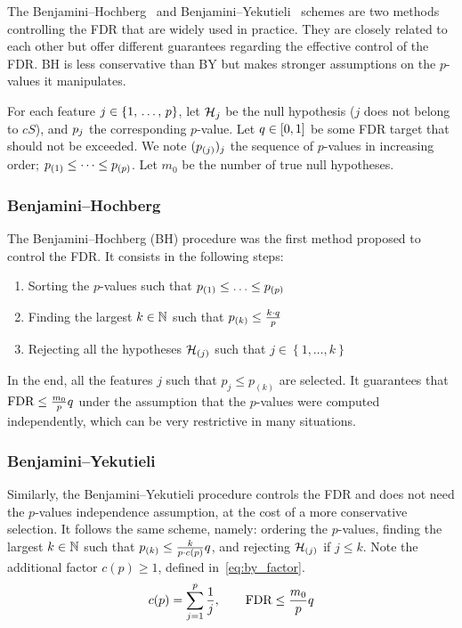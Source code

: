 The Benjamini–Hochberg~\cite{bh} and Benjamini–Yekutieli~\cite{by} schemes are two methods controlling the FDR
that are widely used in practice.
They are closely related to each other but offer different guarantees regarding the effective control of the FDR\@.
BH is less conservative than BY but makes stronger assumptions on the $p$-values it manipulates.

For each feature $j \in \left\{ 1,\, \dots,\, p \right\}$, let $\mathcal{H}_j$ be the null hypothesis ($j$ does not belong to $cS$),
and $p_j$ the corresponding $p$-value.
Let $q \in [0, 1]$ be some FDR target that should not be exceeded.
We note $(p_{(j)})_j$ the sequence of $p$-values in increasing order;
$p_{(1)} \leq \dots \leq p_{(p)}$.
Let $m_0$ be the number of true null hypotheses.

\subsubsection{Benjamini–Hochberg}\label{subsubsec:bh}

The Benjamini–Hochberg (BH) procedure was the first method proposed to control the FDR\@.
It consists in the following steps:
\begin{enumerate}
    \item Sorting the $p$-values such that $p_{(1)} \leq \ldots \leq p_{(p)}$
    \item Finding the largest $k \in \mathbb{N}$ such that $p_{(k)} \leq \frac{k \cdot q}{p}$
    \item Rejecting all the hypotheses $\mathcal{H}_{(j)}$ such that $j \in \left\{ 1, \dots, k \right\}$
\end{enumerate}
In the end, all the features $j$ such that $p_j \leq p_{(k)}$ are selected.
It guarantees that $\text{FDR} \leq \frac{m_0}{p}q$ under the assumption that the $p$-values were computed
independently, which can be very restrictive in many situations.

\subsubsection{Benjamini–Yekutieli}\label{subsubsec:by}

Similarly, the Benjamini–Yekutieli procedure controls the FDR
and does not need the $p$-values independence assumption,
at the cost of a more conservative selection.
It follows the same scheme, namely:
ordering the $p$-values,
finding the largest $k \in \mathbb{N}$ such that $p_{(k)} \leq \frac{k}{p \cdot c(p)}q$,
and rejecting $\mathcal{H}_{(j)}$ if $j \leq k$.
Note the additional factor $c(p) \geq 1$, defined in~\ref{eq:by_factor}.
\begin{equation}\label{eq:by_factor}
c(p) = \sum_{j = 1}^p \frac{1}{j}
,\qquad
\text{FDR} \leq \frac{m_0}{p}q
\end{equation}

